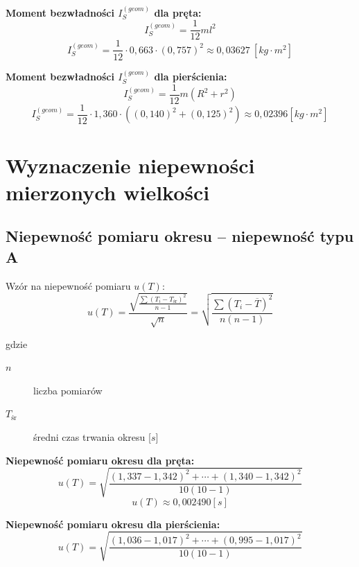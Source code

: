 \documentclass[a4paper,11pt]{article}
\begin{document}
\textbf{Moment bezwładności $I_{S}^{(geom)}$ dla pręta:}
\begin{equation}
I_{S}^{(geom)} = \dfrac{1}{12}ml^{2}
\end{equation}
\begin{equation}
I_{S}^{(geom)} = \dfrac{1}{12}\cdot 0,663 \cdot (0,757)^{2}\approx 0,03627 ~ \left[kg \cdot m^{2}\right]
\end{equation}

\textbf{Moment bezwładności $I_{S}^{(geom)}$ dla pierścienia:}
\begin{equation}
I_{S}^{(geom)} = \dfrac{1}{12}m(R^{2}+r^{2})
\end{equation}
\begin{equation}
I_{S}^{(geom)} = \dfrac{1}{12}\cdot 1,360 \cdot ((0,140)^{2}+(0,125)^{2})\approx 0,02396 \left[kg \cdot m^{2}\right]
\end{equation}

\section{Wyznaczenie niepewności mierzonych wielkości}
\subsection{Niepewność pomiaru okresu -- niepewność typu A}
Wzór na niepewność pomiaru $u(T)$:
\begin{equation}
u(T)=\displaystyle \frac{\sqrt{\frac{\sum(T_{i}-T_{\text{śr}})^{2}}{n-1}}}{\sqrt{n}}=\displaystyle \sqrt{\frac{\sum(T_{i}-\overline{T})^{2}}{n(n-1)}}
\end{equation}

gdzie 
\begin{description}
\item [$n$] liczba pomiarów
\item [$T_{\text{śr}}$] średni czas trwania okresu  [$s$]
\end{description}

\textbf{Niepewność pomiaru okresu dla pręta:}
\begin{equation}
u(T) =\displaystyle \sqrt{\frac{(1,337-1,342)^{2} + \cdots + (1,340 - 1,342)^2}{10(10-1)}}
\end{equation}
$$u(T)\approx 0,002490 [s]$$

\textbf{Niepewność pomiaru okresu dla pierścienia:}
\begin{equation}
u(T) =\displaystyle \sqrt{\frac{(1,036-1,017)^{2} + \cdots + (0,995 - 1,017)^2}{10(10-1)}}
\end{equation}
\end{document}
